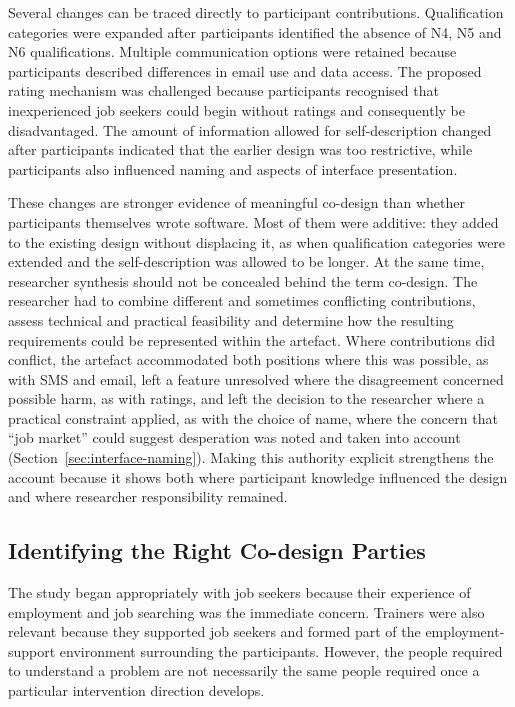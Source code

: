Several changes can be traced directly to participant contributions. Qualification categories were expanded after participants identified the absence of N4, N5 and N6 qualifications. Multiple communication options were retained because participants described differences in email use and data access. The proposed rating mechanism was challenged because participants recognised that inexperienced job seekers could begin without ratings and consequently be disadvantaged. The amount of information allowed for self-description changed after participants indicated that the earlier design was too restrictive, while participants also influenced naming and aspects of interface presentation.

These changes are stronger evidence of meaningful co-design than whether participants themselves wrote software. Most of them were additive: they added to the existing design without displacing it, as when qualification categories were extended and the self-description was allowed to be longer. At the same time, researcher synthesis should not be concealed behind the term co-design. The researcher had to combine different and sometimes conflicting contributions, assess technical and practical feasibility and determine how the resulting requirements could be represented within the artefact. Where contributions did conflict, the artefact accommodated both positions where this was possible, as with SMS and email, left a feature unresolved where the disagreement concerned possible harm, as with ratings, and left the decision to the researcher where a practical constraint applied, as with the choice of name, where the concern that ``job market'' could suggest desperation was noted and taken into account (Section~\ref{sec:interface-naming}). Making this authority explicit strengthens the account because it shows both where participant knowledge influenced the design and where researcher responsibility remained.


\subsection{Identifying the Right Co-design Parties}

The study began appropriately with job seekers because their experience of employment and job searching was the immediate concern. Trainers were also relevant because they supported job seekers and formed part of the employment-support environment surrounding the participants. However, the people required to understand a problem are not necessarily the same people required once a particular intervention direction develops.

